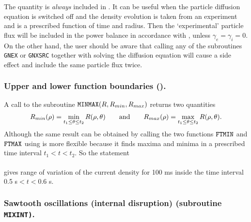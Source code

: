 The quantity  is {\em always} included in . 
It can be useful when the particle diffusion equation is switched off
and the density evolution is taken from an experiment and is a
prescribed function of time and radius. 
Then the `experimental' particle flux  will be included
in the power balance in accordance with , unless 
$\gamma_e=\gamma_i=0.$ 
On the other hand, the user should be aware that calling any of the
subroutines {\tt GNEX} or {\tt GNXSRC} together with solving the
diffusion equation will cause a side effect and include the same
particle flux twice. 

\subsubsection{Upper and lower function boundaries ().}
A call to the subroutine ${\tt MINMAX}(R,R_{min},R_{max})$ returns two
quantities 
$$
R_{min}(\rho)
=\mathop{\rm min}\limits_{t_1\leq\theta\leq t_2}R(\rho,\theta)
\qquad\mbox{and}\qquad
R_{max}(\rho)
=\mathop{\rm max}\limits_{t_1\leq\theta\leq t_2}R(\rho,\theta)
.$$
Although the same result can be obtained by calling the two functions
${\tt FTMIN}$ and  ${\tt FTMAX}$ using  is more flexible
because it finds maxima and minima in a prescribed time interval
$t_1<t<t_2.$ 
So the statement
\\ \indent
{}
\\
gives range of variation of the current density for 100 ms inside the
time interval 0.5 s$<t<$0.6 s.

\subsubsection{Sawtooth oscillations (internal disruption) 
{\rm (subroutine \tt MIXINT)}.}

